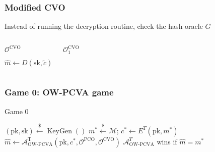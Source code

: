 \documentclass{beamer}
\newcommand{\leftsample}{\overset{{\scriptscriptstyle\$}}{\leftarrow}}
\begin{document}
\begin{frame}
    \frametitle{Modified CVO}

    Instead of running the decryption routine, check the hash oracle $G$

    \begin{columns}
        \begin{algorithm}[H]
            \SetAlgoLined
            \caption{$\mathcal{O}^\text{CVO}$}
            $\hat{m} \leftarrow D(\text{sk}, \tilde{c})$\;
            \;
        \end{algorithm}

        \begin{algorithm}[H]
            \SetAlgoLined
            \caption{$\mathcal{O}^\text{CVO}_1$}
            \Return{$\bot$}
        \end{algorithm}
    \end{columns}
\end{frame}

\begin{frame}
    \frametitle{Game 0: OW-PCVA game}

    \begin{algorithm}[H]
        \SetAlgoLined
        \caption{Game 0}

        $(\text{pk}, \text{sk}) \leftsample \operatorname{KeyGen}()$\;
        $m^\ast \leftsample \mathcal{M}$;
        $c^\ast \leftarrow E^T(\text{pk}, m^\ast)$\;
        $\hat{m} \leftarrow \mathcal{A}^\text{T}_\text{OW-PCVA}(
            \text{pk}, c^\ast, \mathcal{O}^\text{PCO}, \mathcal{O}^\text{CVO}
        )$\;
        $\mathcal{A}^T_\text{OW-PCVA}$ wins if $\hat{m} = m^\ast$
    \end{algorithm}
\end{frame}
\end{document}
